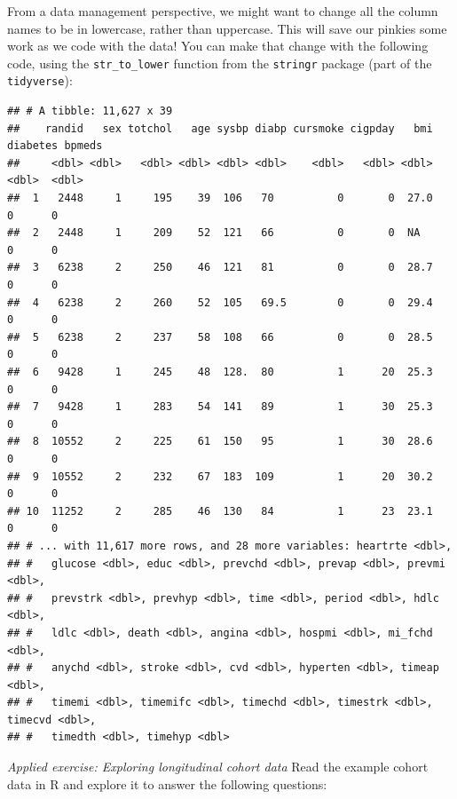 \documentclass[
]{book}
\newenvironment{Shaded}{\begin{snugshade}}{\end{snugshade}}
\newcommand{\DataTypeTok}[1]{\textcolor[rgb]{0.13,0.29,0.53}{#1}}
\newcommand{\KeywordTok}[1]{\textcolor[rgb]{0.13,0.29,0.53}{\textbf{#1}}}
\newcommand{\NormalTok}[1]{#1}
\newcommand{\OperatorTok}[1]{\textcolor[rgb]{0.81,0.36,0.00}{\textbf{#1}}}
\newcommand{\StringTok}[1]{\textcolor[rgb]{0.31,0.60,0.02}{#1}}
\begin{document}
From a data management perspective, we might want to change all the column names
to be in lowercase, rather than uppercase. This will save our pinkies some
work as we code with the data! You can make that change with the following
code, using the \texttt{str\_to\_lower} function from the \texttt{stringr} package (part of
the \texttt{tidyverse}):

\begin{Shaded}
\end{Shaded}

\begin{verbatim}
## # A tibble: 11,627 x 39
##    randid   sex totchol   age sysbp diabp cursmoke cigpday   bmi diabetes bpmeds
##     <dbl> <dbl>   <dbl> <dbl> <dbl> <dbl>    <dbl>   <dbl> <dbl>    <dbl>  <dbl>
##  1   2448     1     195    39  106   70          0       0  27.0        0      0
##  2   2448     1     209    52  121   66          0       0  NA          0      0
##  3   6238     2     250    46  121   81          0       0  28.7        0      0
##  4   6238     2     260    52  105   69.5        0       0  29.4        0      0
##  5   6238     2     237    58  108   66          0       0  28.5        0      0
##  6   9428     1     245    48  128.  80          1      20  25.3        0      0
##  7   9428     1     283    54  141   89          1      30  25.3        0      0
##  8  10552     2     225    61  150   95          1      30  28.6        0      0
##  9  10552     2     232    67  183  109          1      20  30.2        0      0
## 10  11252     2     285    46  130   84          1      23  23.1        0      0
## # ... with 11,617 more rows, and 28 more variables: heartrte <dbl>,
## #   glucose <dbl>, educ <dbl>, prevchd <dbl>, prevap <dbl>, prevmi <dbl>,
## #   prevstrk <dbl>, prevhyp <dbl>, time <dbl>, period <dbl>, hdlc <dbl>,
## #   ldlc <dbl>, death <dbl>, angina <dbl>, hospmi <dbl>, mi_fchd <dbl>,
## #   anychd <dbl>, stroke <dbl>, cvd <dbl>, hyperten <dbl>, timeap <dbl>,
## #   timemi <dbl>, timemifc <dbl>, timechd <dbl>, timestrk <dbl>, timecvd <dbl>,
## #   timedth <dbl>, timehyp <dbl>
\end{verbatim}

\emph{Applied exercise: Exploring longitudinal cohort data}
Read the example cohort data in R and explore it to answer the following
questions:
\end{document}
